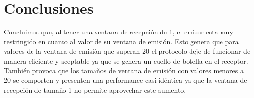 \newpage
\section{Conclusiones}
\indent Concluimos que, al tener una ventana de recepción de 1, el emisor esta muy
restringido en cuanto al valor de su ventana de emisión. Esto genera que para
valores de la ventana de emisión que superan 20 el protocolo deje de funcionar de manera eficiente y aceptable ya que se genera un cuello de botella en el receptor. También provoca que los tamaños de ventana de emisión con valores menores a 20 se comporten y presenten una performance casi idéntica ya que la ventana de recepción de tamaño 1 no permite aprovechar este aumento.\\
\indent 